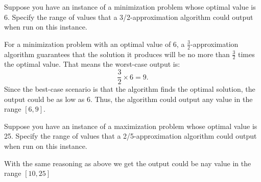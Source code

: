 \documentclass[12pt, letterpaper]{article}
\begin{document}
\begin{subproblem}{}
    Suppose you have an instance of a minimization problem whose optimal value is 6.
    Specify the range of values that a 3/2-approximation algorithm could output when run on this instance.
\end{subproblem}
\begin{solution}
    For a minimization problem with an optimal value of 6, a \( \frac{3}{2} \)-approximation algorithm guarantees that the solution it produces will be no more than \( \frac{3}{2} \) times the optimal value. That means the worst-case output is:
\[
\frac{3}{2} \times 6 = 9.
\]
Since the best-case scenario is that the algorithm finds the optimal solution, the output could be as low as 6. Thus, the algorithm could output any value in the range \([6, 9]\).
\end{solution}
\begin{subproblem}{}
    Suppose you have an instance of a maximization problem whose optimal value is 25.
    Specify the range of values that a 2/5-approximation algorithm could output when run on this instance.
\end{subproblem}
\begin{solution}
    With the same reasoning as above we get the output could be nay value in the range $[10,25]$
\end{solution}
\end{document}
